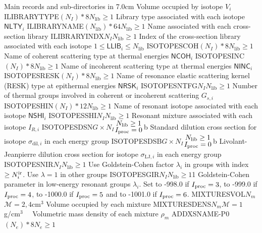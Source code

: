 \begin{DescriptionEnregistrement}{Main records and sub-directories in }{7.0cm}
  {Volume occupied by isotope $V_{i}$}
\OptCharEnr
  {ILIBRARYTYPE}{$(N_{I})*8$}{$N_{\mathrm{lib}}\ge 1$}
  {Library type associated with each isotope $\mathsf{NLTY}_{i}$}
\OptCharEnr
  {ILIBRARYNAME}{$(N_{\mathrm{lib}})*64$}{$N_{\mathrm{lib}}\ge 1$}
  {Name associated with each cross-section library}
\OptIntEnr
  {ILIBRARYINDX}{$N_{I}$}{$N_{\mathrm{lib}}\ge 1$}
  {Index of the cross-section library associated with each isotope $1 \le \mathsf{LLIB}_{i}\le N_{\mathrm{lib}}$}
\OptCharEnr
  {ISOTOPESCOH}{$(N_{I})*8$}{$N_{\mathrm{lib}}\ge 1$}
  {Name of coherent scattering type at thermal energies $\mathsf{NCOH}_{i}$}
\OptCharEnr
  {ISOTOPESINC}{$(N_{I})*8$}{$N_{\mathrm{lib}}\ge 1$}
  {Name of incoherent scattering type at thermal energies $\mathsf{NINC}_{i}$}
\OptCharEnr
  {ISOTOPESRESK}{$(N_{I})*8$}{$N_{\mathrm{lib}}\ge 1$}
  {Name of resonance elastic scattering kernel (RESK) type at epithermal energies $\mathsf{NRSK}_{i}$}
\OptIntEnr
  {ISOTOPESNTFG}{$N_{I}$}{$N_{\mathrm{lib}}\ge 1$}
  {Number of thermal groups involved in coherent or incoherent scattering $G_{s,i}$}
\OptCharEnr
  {ISOTOPESHIN}{$(N_{I})*12$}{$N_{\mathrm{lib}}\ge 1$}
  {Name of resonant isotope associated with each isotope $\mathsf{NSHI}_{i}$}
\OptIntEnr
  {ISOTOPESSHI}{$N_{I}$}{$N_{\mathrm{lib}}\ge 1$}
  {Resonant mixture associated with each isotope $I_{R,i}$}
\OptRealEnr
  {ISOTOPESDSN}{$G \times N_{I}$}{${\displaystyle N_{\mathrm{lib}}\ge 1 \atop
  \displaystyle I_{\rm proc}=0}$}{b}
  {Standard dilution cross section for isotope $\sigma_{\mathrm{dil},i}$ in each energy group}
\OptRealEnr
  {ISOTOPESDSB}{$G \times N_{I}$}{${\displaystyle N_{\mathrm{lib}}\ge 1 \atop
  \displaystyle I_{\rm proc}=0}$}{b}
  {Livolant-Jeanpierre dilution cross section for isotope $\sigma_{\mathrm{LJ},i}$ in each energy group}
\OptIntEnr
  {ISOTOPESNIR}{$N_{I}$}{$N_{\mathrm{lib}}\ge 1$}
  {Use Goldstein-Cohen factor $\lambda_i$ in groups with index $\ge N^{\rm ir}_i$.
  Use $\lambda=1$ in other groups}
\OptRealEnr
  {ISOTOPESGIR}{$N_{I}$}{$N_{\mathrm{lib}}\ge 1$}{1}
  {Goldstein-Cohen parameter in low-energy resonant groups $\lambda_i$. Set to -998.0 if
  $I_{\rm proc}=3$, to -999.0 if $I_{\rm proc}=4$, to -1000.0 if $I_{\rm proc}=5$ and to -1001.0 if $I_{\rm proc}=6$.}
\OptRealEnr
  {MIXTURESVOL}{$N_{m}$}{$\mathcal{M}=2, 4$}{cm$^{3}$}
  {Volume occupied by each mixture}
\OptRealEnr
  {MIXTURESDENS}{$N_{m}$}{$\mathcal{M}=1$}{g/cm$^{3}$~~}
  {Volumetric mass density of each mixture $\rho_{m}$}
\OptCharEnr
  {ADDXSNAME-P0}{$(N_{e})*8$}{$N_{e}\ge 1$}

\end{DescriptionEnregistrement}
